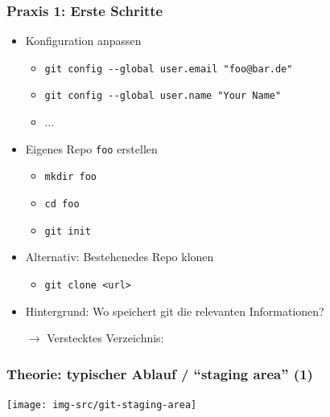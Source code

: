 \documentclass{beamer}
\begin{document}

\begin{frame}[label=gitintro20]
\frametitle{Praxis 1: Erste Schritte}
\begin{itemize}
 \item Konfiguration anpassen
 \begin{itemize}
  \item \texttt{git config -{}-global user.email "foo@bar.de"}
  \item \texttt{git config -{}-global user.name "Your Name"}
  \item ...
 \end{itemize}

 \item Eigenes Repo \texttt{foo} erstellen
 \begin{itemize}
  \item \texttt{mkdir foo}
  \item \texttt{cd foo}
  \item \texttt{git init}
 \end{itemize}
 \item Alternativ: Bestehenedes Repo klonen
 \begin{itemize}
  \item \texttt{git clone <url>}
 \end{itemize}
 \item[]
 \pause
 \item Hintergrund: Wo speichert git die relevanten Informationen?
 \item[$\rightarrow$] Verstecktes Verzeichnis:


\end{itemize}

\end{frame}

\begin{frame}
  \frametitle{Theorie: typischer Ablauf / "`staging area"' (1)}
  \begin{center}
    \texttt{[image: img-src/git-staging-area]}
  \end{center}
\end{frame}
\end{document}
